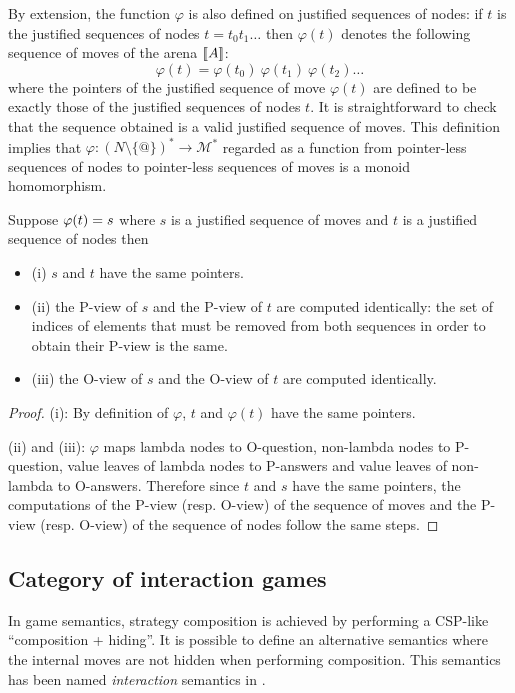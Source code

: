 By extension, the function $\varphi$ is also defined on justified
sequences of nodes: if $t$ is the justified sequences of nodes $t =
t_0 t_1 \ldots$ then $\varphi(t)$ denotes the following sequence of
moves of the arena ${[\![ A ]\!]}$:
$$\varphi(t) = \varphi(t_0)\ \varphi(t_1)\  \varphi(t_2) \ldots$$
where the pointers of the justified sequence of move $\varphi(t)$
are defined to be exactly those of the justified sequences of nodes
$t$. It is straightforward to check that the sequence obtained is a
valid justified sequence of moves.
This definition implies that $\varphi : (N\setminus\{@\})^* \rightarrow \mathcal{M}^*$ regarded as a function
from pointer-less sequences of nodes to pointer-less sequences of moves is a monoid homomorphism.

\begin{property}
\label{proper:phi_pview} Suppose $\varphi(t) = s$ where $s$ is a
justified sequence of moves and $t$ is a justified sequence of nodes
then
\begin{itemize}
\item (i) $s$ and $t$ have the same pointers.
\item (ii) the P-view of $s$ and the P-view of $t$ are computed
identically: the set of indices of elements that must be removed
from both sequences in order to obtain their P-view is the same.
\item (iii) the O-view of $s$ and the O-view of $t$ are computed identically.
\end{itemize}
\end{property}
\begin{proof}
(i): By definition of $\varphi$, $t$ and $\varphi(t)$ have the same
pointers.

(ii) and (iii): $\varphi$ maps lambda nodes to O-question,
non-lambda nodes to P-question, value leaves of lambda nodes to P-answers and
value leaves of non-lambda to O-answers. Therefore since $t$ and $s$ have the
same pointers, the computations of the P-view (resp. O-view) of the
sequence of moves and the P-view (resp. O-view) of the sequence of
nodes follow the same steps.
\end{proof}


\subsection{Category of interaction games}

In game semantics, strategy composition is achieved by performing a CSP-like ``composition + hiding''.
It is possible to define an alternative semantics where the internal moves are not hidden when performing composition.
This semantics has been named \emph{interaction} semantics in \cite{DBLP:conf/sas/DimovskiGL05}.

